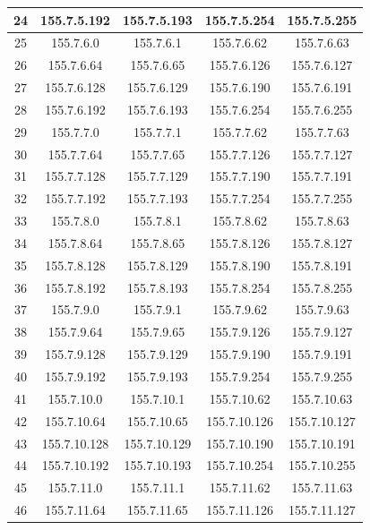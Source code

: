 \documentclass[letterpaper,12pt]{article}
\begin{document}
\begin{longtable}{|c|c|c|c|c|}
        24 & 155.7.5.192 & 155.7.5.193 & 155.7.5.254 & 155.7.5.255 \\ \hline
        25 & 155.7.6.0 & 155.7.6.1 & 155.7.6.62 & 155.7.6.63 \\ \hline
        26 & 155.7.6.64 & 155.7.6.65 & 155.7.6.126 & 155.7.6.127 \\ \hline
        27 & 155.7.6.128 & 155.7.6.129 & 155.7.6.190 & 155.7.6.191 \\ \hline
        28 & 155.7.6.192 & 155.7.6.193 & 155.7.6.254 & 155.7.6.255 \\ \hline
        29 & 155.7.7.0 & 155.7.7.1 & 155.7.7.62 & 155.7.7.63 \\ \hline
        30 & 155.7.7.64 & 155.7.7.65 & 155.7.7.126 & 155.7.7.127 \\ \hline
        31 & 155.7.7.128 & 155.7.7.129 & 155.7.7.190 & 155.7.7.191 \\ \hline
        32 & 155.7.7.192 & 155.7.7.193 & 155.7.7.254 & 155.7.7.255 \\ \hline
        33 & 155.7.8.0 & 155.7.8.1 & 155.7.8.62 & 155.7.8.63 \\ \hline
        34 & 155.7.8.64 & 155.7.8.65 & 155.7.8.126 & 155.7.8.127 \\ \hline
        35 & 155.7.8.128 & 155.7.8.129 & 155.7.8.190 & 155.7.8.191 \\ \hline
        36 & 155.7.8.192 & 155.7.8.193 & 155.7.8.254 & 155.7.8.255 \\ \hline
        37 & 155.7.9.0 & 155.7.9.1 & 155.7.9.62 & 155.7.9.63 \\ \hline
        38 & 155.7.9.64 & 155.7.9.65 & 155.7.9.126 & 155.7.9.127 \\ \hline
        39 & 155.7.9.128 & 155.7.9.129 & 155.7.9.190 & 155.7.9.191 \\ \hline
        40 & 155.7.9.192 & 155.7.9.193 & 155.7.9.254 & 155.7.9.255 \\ \hline
        41 & 155.7.10.0 & 155.7.10.1 & 155.7.10.62 & 155.7.10.63 \\ \hline
        42 & 155.7.10.64 & 155.7.10.65 & 155.7.10.126 & 155.7.10.127 \\ \hline
        43 & 155.7.10.128 & 155.7.10.129 & 155.7.10.190 & 155.7.10.191 \\ \hline
        44 & 155.7.10.192 & 155.7.10.193 & 155.7.10.254 & 155.7.10.255 \\ \hline
        45 & 155.7.11.0 & 155.7.11.1 & 155.7.11.62 & 155.7.11.63 \\ \hline
        46 & 155.7.11.64 & 155.7.11.65 & 155.7.11.126 & 155.7.11.127 \\ \hline

\end{longtable}
\end{document}
